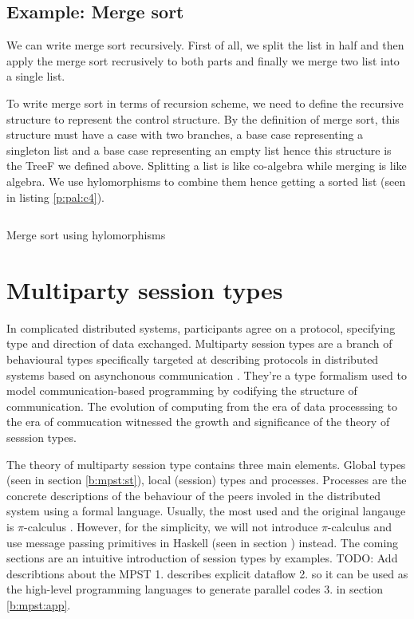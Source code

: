 \subsection{Example: Merge sort} \label{b:rs:ex}
We can write merge sort recursively. First of all, we split the list in half and then apply the merge sort recrusively to both parts and finally we merge two list into a single list. 

To write merge sort in terms of recursion scheme, we need to define the recursive structure to represent the control structure. By the definition of merge sort, this structure must have a case with two branches, a base case representing a singleton list and a base case representing an empty list hence this structure is the TreeF we defined above. Splitting a list is like co-algebra while merging is like algebra. We use hylomorphisms to combine them hence getting a sorted list (seen in listing \ref{p:pal:c4}).
\begin{code}
\inputminted{haskell}{project/pal-ms.hs}
\caption{Merge sort using hylomorphisms} \label{p:pal:c4}
\end{code}
\section{Multiparty session types} \label{b:mpst}
In complicated distributed systems, participants agree on a protocol, specifying type and direction of data exchanged. Multiparty session types are a branch of behavioural types specifically targeted at describing protocols in distributed systems based on asynchonous communication \cite{coppoGentleIntroductionMultiparty2015}. They're a type formalism used to model communication-based programming by codifying the structure of communication. The evolution of computing from the era of data processsing to the era of commucation witnessed the growth and significance of the theory of sesssion types.

The theory of multiparty session type contains three main elements. Global types (seen in section \ref{b:mpst:st}), local (session) types and processes. Processes are the concrete descriptions of the behaviour of the peers involed in the distributed system \cite{coppoGentleIntroductionMultiparty2015} using a formal language. Usually, the most used and the original langauge is $\pi$-calculus \cite{milnerCalculusMobileProcesses1992}. However, for the simplicity, we will not introduce $\pi$-calculus and use message passing primitives in Haskell (seen in section \label{b:mo:mpc}) instead. The coming sections are an intuitive introduction of session types by examples.
TODO: Add describtions about the MPST 1. describes explicit dataflow 2. so it can be used as the high-level programming languages to generate parallel codes 3. in section \ref{b:mpst:app}.

